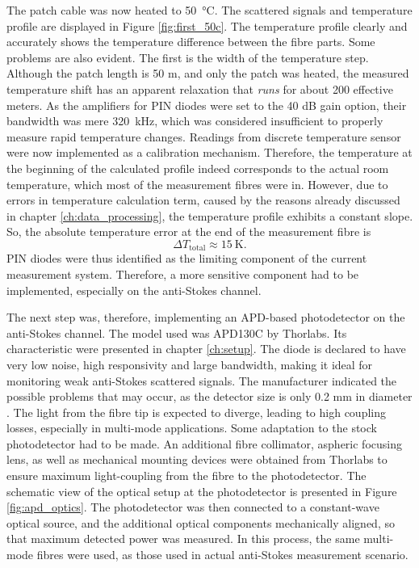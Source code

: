 \documentclass{standalone}
\begin{document}
The patch cable was now heated to \SI{50}{\celsius}. The scattered signals and temperature profile are displayed in Figure \ref{fig:first_50c}.
The temperature profile clearly and accurately shows the temperature difference between the fibre parts. Some problems are also evident. The first is the width of the temperature step. Although the patch length is 50 m, and only the patch was heated, the measured temperature shift has an apparent relaxation that \textit{runs} for about 200 effective meters. As the amplifiers for PIN diodes were set to the 40 dB gain option, their bandwidth was mere \SI{320}{\kilo \hertz}, which was considered insufficient to properly measure rapid temperature changes. Readings from discrete temperature sensor were now implemented as a calibration mechanism. Therefore, the temperature at the beginning of the calculated profile indeed corresponds to the actual room temperature, which most of the measurement fibres were in. However, due to errors in temperature calculation term, caused by the reasons already discussed in chapter \ref{ch:data_processing}, the temperature profile exhibits a constant slope. So, the absolute temperature error at the end of the measurement fibre is 
\begin{equation}
\varDelta T_\textrm{total} \approx \SI{15}{\kelvin} \textrm{.}
\end{equation}
PIN diodes were thus identified as the limiting component of the current measurement system. Therefore, a more sensitive component had to be implemented, especially on the anti-Stokes channel.

The next step was, therefore, implementing an APD-based photodetector on the anti-Stokes channel. The model used was APD130C by Thorlabs. Its characteristic were presented in chapter \ref{ch:setup}. The diode is declared to have very low noise, high responsivity and large bandwidth, making it ideal for monitoring weak anti-Stokes scattered signals. The manufacturer indicated the possible problems that may occur, as the detector size is only 0.2 mm in diameter \cite{datasheet:apd130c}. The light from the fibre tip is expected to diverge, leading to high coupling losses, especially in multi-mode applications. Some adaptation to the stock photodetector had to be made. An additional fibre collimator, aspheric focusing lens, as well as mechanical mounting devices were obtained from Thorlabs to ensure maximum light-coupling from the fibre to the photodetector. The schematic view of the optical setup at the photodetector is presented in Figure \ref{fig:apd_optics}.
The photodetector was then connected to a constant-wave optical source, and the additional optical components mechanically aligned, so that maximum detected power was measured. In this process, the same multi-mode fibres were used, as those used in actual anti-Stokes measurement scenario. \\
\end{document}
